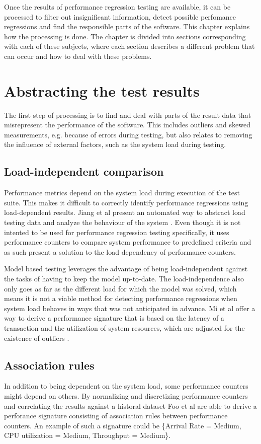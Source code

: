 
Once the results of performance regression testing are available, it can be processed to filter out insignificant information, detect possible perfomance regressions and find the responsible parts of the software. This chapter explains how the processing is done. The chapter is divided into sections corresponding with each of these subjects, where each section describes a different problem that can occur and how to deal with these problems.

\section{Abstracting the test results}
The first step of processing is to find and deal with parts of the result data that misrepresent the performance of the software. This includes outliers and skewed measurements, e.g. because of errors during testing, but also relates to removing the influence of external factors, such as the system load during testing.

\subsection{Load-independent comparison}
Performance metrics depend on the system load during execution of the test suite. This makes it difficult to correctly identify performance regressions using load-dependent results. Jiang et al present an automated way to abstract load testing data and analyze the behaviour of the system \cite{jiang2010automated}. Even though it is not intented to be used for performance regression testing specifically, it uses performance counters to compare system performance to predefined criteria and as such present a solution to the load dependency of performance counters.

Model based testing leverages the advantage of being load-independent against the tasks of having to keep the model up-to-date. The load-independence also only goes as far as the different load for which the model was solved, which means it is not a viable method for detecting performance regressions when system load behaves in ways that was not anticipated in advance. Mi et al offer a way to derive a performance signature that is based on the latency of a transaction and the utilization of system resources, which are adjusted for the existence of outliers \cite{mi2008analysis}.

\subsection{Association rules}
In addition to being dependent on the system load, some performance counters might depend on others. By normalizing and discretizing performance counters and correlating the results against a historal dataset Foo et al are able to derive a perforance signature \cite{foo2010mining} consisting of association rules between performance counters. An example of such a signature could be \{Arrival Rate = Medium, CPU utilization = Medium, Throughput = Medium\}.

